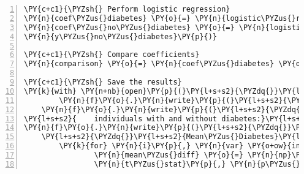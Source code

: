 \documentclass[12pt]{article}
\begin{document}
\begin{Verbatim}[commandchars=\\\{\},numbers=left,firstnumber=1,stepnumber=1,formatcom=\footnotesize]
\PY{c+c1}{\PYZsh{} Perform logistic regression}
\PY{n}{coef\PYZus{}diabetes} \PY{o}{=} \PY{n}{logistic\PYZus{}regression\PYZus{}kfold}\PY{p}{(}\PY{n}{X\PYZus{}diabetes}\PY{p}{,} \PY{n}{y\PYZus{}diabetes}\PY{p}{)}
\PY{n}{coef\PYZus{}no\PYZus{}diabetes} \PY{o}{=} \PY{n}{logistic\PYZus{}regression\PYZus{}kfold}\PY{p}{(}\PY{n}{X\PYZus{}no\PYZus{}diabetes}\PY{p}{,} \PYZbs{}
\PY{n}{y\PYZus{}no\PYZus{}diabetes}\PY{p}{)}

\PY{c+c1}{\PYZsh{} Compare coefficients}
\PY{n}{comparison} \PY{o}{=} \PY{n}{coef\PYZus{}diabetes} \PY{o}{\PYZhy{}} \PY{n}{coef\PYZus{}no\PYZus{}diabetes}

\PY{c+c1}{\PYZsh{} Save the results}
\PY{k}{with} \PY{n+nb}{open}\PY{p}{(}\PY{l+s+s2}{\PYZdq{}}\PY{l+s+s2}{results.txt}\PY{l+s+s2}{\PYZdq{}}\PY{p}{,} \PY{l+s+s2}{\PYZdq{}}\PY{l+s+s2}{w}\PY{l+s+s2}{\PYZdq{}}\PY{p}{)} \PY{k}{as} \PY{n}{f}\PY{p}{:}
        \PY{n}{f}\PY{o}{.}\PY{n}{write}\PY{p}{(}\PY{l+s+s2}{\PYZdq{}}\PY{l+s+s2}{Research Goal Results:}\PY{l+s+se}{\PYZbs{}n}\PY{l+s+se}{\PYZbs{}n}\PY{l+s+s2}{\PYZdq{}}\PY{p}{)}
    \PY{n}{f}\PY{o}{.}\PY{n}{write}\PY{p}{(}\PY{l+s+s2}{\PYZdq{}}\PY{l+s+s2}{Comparison of Logistic Regression Coefficients between }\PY{l+s+se}{\PYZbs{}}
\PY{l+s+s2}{    individuals with and without diabetes:}\PY{l+s+se}{\PYZbs{}n}\PY{l+s+se}{\PYZbs{}n}\PY{l+s+s2}{\PYZdq{}}\PY{p}{)}
\PY{n}{f}\PY{o}{.}\PY{n}{write}\PY{p}{(}\PY{l+s+s2}{\PYZdq{}}\PY{l+s+si}{\PYZob{}:\PYZlt{}20\PYZcb{}}\PY{l+s+se}{\PYZbs{}t}\PY{l+s+si}{\PYZob{}:\PYZlt{}12\PYZcb{}}\PY{l+s+se}{\PYZbs{}t}\PY{l+s+si}{\PYZob{}:\PYZlt{}12\PYZcb{}}\PY{l+s+se}{\PYZbs{}t}\PY{l+s+si}{\PYZob{}:\PYZlt{}16\PYZcb{}}\PY{l+s+se}{\PYZbs{}t}\PY{l+s+si}{\PYZob{}:\PYZlt{}16\PYZcb{}}\PY{l+s+se}{\PYZbs{}n}\PY{l+s+s2}{\PYZdq{}}\PY{o}{.}\PY{n}{format}\PY{p}{(}\PY{l+s+s2}{\PYZdq{}}\PY{l+s+s2}{Variable}\PY{l+s+s2}{\PYZdq{}}\PY{p}{,} \PYZbs{}
    \PY{l+s+s2}{\PYZdq{}}\PY{l+s+s2}{Mean\PYZus{}Diabetes}\PY{l+s+s2}{\PYZdq{}}\PY{p}{,} \PY{l+s+s2}{\PYZdq{}}\PY{l+s+s2}{Mean\PYZus{}No\PYZus{}Diabetes}\PY{l+s+s2}{\PYZdq{}}\PY{p}{,} \PY{l+s+s2}{\PYZdq{}}\PY{l+s+s2}{Difference}\PY{l+s+s2}{\PYZdq{}}\PY{p}{,} \PY{l+s+s2}{\PYZdq{}}\PY{l+s+s2}{p\PYZhy{}value}\PY{l+s+s2}{\PYZdq{}}\PY{p}{)}\PY{p}{)}
        \PY{k}{for} \PY{n}{i}\PY{p}{,} \PY{n}{var} \PY{o+ow}{in} \PY{n+nb}{enumerate}\PY{p}{(}\PY{n}{lifestyle\PYZus{}vars} \PY{o}{+} \PY{n}{control\PYZus{}vars}\PY{p}{)}\PY{p}{:}
                \PY{n}{mean\PYZus{}diff} \PY{o}{=} \PY{n}{np}\PY{o}{.}\PY{n}{mean}\PY{p}{(}\PY{n}{comparison}\PY{p}{[}\PY{p}{:}\PY{p}{,} \PY{n}{i}\PY{p}{]}\PY{p}{)}
                \PY{n}{t\PYZus{}stat}\PY{p}{,} \PY{n}{p\PYZus{}value} \PY{o}{=} \PY{n}{stats}\PY{o}{.}\PY{n}{ttest\PYZus{}1samp}\PY{p}{(}\PY{n}{comparison}\PY{p}{[}\PY{p}{:}\PY{p}{,} \PY{n}{i}\PY{p}{]}\PY{p}{,} \PY{l+m+mi}{0}\PY{p}{)}

\end{Verbatim}
\end{document}
